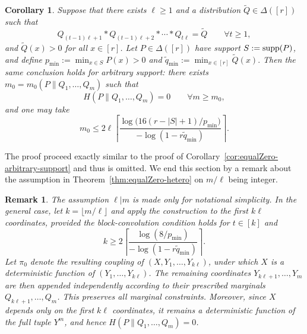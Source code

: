 \documentclass[journal]{IEEEtran}
\newtheorem{corollary}{Corollary}
\newtheorem{remark}{Remark}
\def\supp{\mathop{\rm supp}}
\newcommand{\1}{\mathbf{1}}
\begin{document}
\begin{corollary}\label{cor:equalZero-hetero-arbitrary-support}
Suppose that there exists \(\ell\ge 1\) and a distribution \(\widetilde Q\in\Delta([r])\) such that
\[
Q_{(t-1)\ell+1} * Q_{(t-1)\ell+2} * \cdots * Q_{t\ell}
=
\widetilde Q
\qquad \forall t\ge 1,
\]
and \(\widetilde Q(x)>0\) for all \(x\in[r]\). Let \(P\in\Delta([r])\) have support \(S:=\supp(P)\), and define
\(p_{\min}:=\min_{x\in S} P(x)>0\) and \(\widetilde q_{\min}:=\min_{x\in[r]} \widetilde Q(x).\)
Then the same conclusion holds for arbitrary support: there exists \(m_0=m_0(P\|Q_1, \dots, Q_m)\) such that
\[
H(P\|Q_1,\dots,Q_m)=0
\qquad \forall m\ge m_0,
\]
and one may take
\[
m_0
\le
2\ell\left\lceil
\frac{\log\!\bigl(16(r-|S|+1)/p_{\min}\bigr)}
{-\log(1-r\widetilde q_{\min})}
\right\rceil.
\]
\end{corollary}
The proof proceed exactly similar to the proof of Corollary~\ref{cor:equalZero-arbitrary-support} and thus is omitted. 
We end this section by a remark about the assumption in  Theorem~\ref{thm:equalZero-hetero} on $m/\ell$ being integer.
\begin{remark}
The assumption $\ell|m$ is made only for notational simplicity. In the general case, let $k=\lfloor m/\ell\rfloor$ and apply the construction to the first $k\ell$ coordinates, provided the block-convolution condition holds for $t\in [k]$ and
$$k\ge2\left\lceil\frac{\log(8/p_{\min})}{-\log(1-r\widetilde q_{\min})}\right\rceil.$$
Let $\pi_0$ denote the resulting coupling of $(X,Y_1,\dots,Y_{k\ell})$, under which $X$ is a deterministic function of $(Y_1,\dots,Y_{k\ell})$. The remaining coordinates $Y_{k\ell+1},\dots,Y_m$ are then appended independently according to their prescribed marginals $Q_{k\ell+1},\dots,Q_m$. 
This preserves all marginal constraints. Moreover, since $X$ depends only on the first $k\ell$ coordinates, it remains a deterministic function of the full tuple $Y^m$, and hence $H(P\|Q_1,\dots,Q_m)=0$.
\end{remark}

\end{document}

